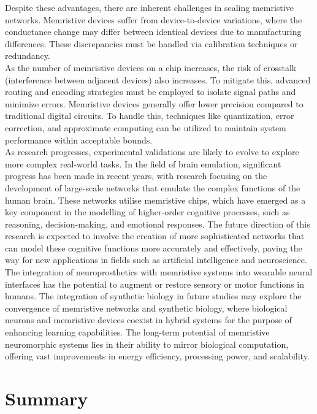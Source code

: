 \noindent Despite these advantages, there are inherent challenges in scaling memristive networks. Memristive devices suffer from device-to-device variations, where the conductance change may differ between identical devices due to manufacturing differences. These discrepancies must be handled via calibration techniques or redundancy. \\

\noindent As the number of memristive devices on a chip increases, the risk of crosstalk (interference between adjacent devices) also increases. To mitigate this, advanced routing and encoding strategies must be employed to isolate signal paths and minimize errors. Memristive devices generally offer lower precision compared to traditional digital circuits. To handle this, techniques like quantization, error correction, and approximate computing can be utilized to maintain system performance within acceptable bounds.\\

\noindent As research progresses, experimental validations are likely to evolve to explore more complex real-world tasks. In the field of brain emulation, significant progress has been made in recent years, with research focusing on the development of large-scale networks that emulate the complex functions of the human brain. These networks utilise memristive chips, which have emerged as a key component in the modelling of higher-order cognitive processes, such as reasoning, decision-making, and emotional responses. The future direction of this research is expected to involve the creation of more sophisticated networks that can model these cognitive functions more accurately and effectively, paving the way for new applications in fields such as artificial intelligence and neuroscience. \\

\noindent The integration of neuroprosthetics with memristive systems into wearable neural interfaces has the potential to augment or restore sensory or motor functions in humans. The integration of synthetic biology in future studies may explore the convergence of memristive networks and synthetic biology, where biological neurons and memristive devices coexist in hybrid systems for the purpose of enhancing learning capabilities. The long-term potential of memristive neuromorphic systems lies in their ability to mirror biological computation, offering vast improvements in energy efficiency, processing power, and scalability.

\section[Summary]{Summary}

